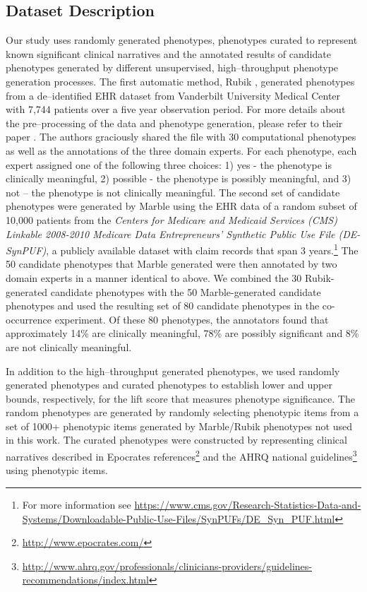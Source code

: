 \documentclass{sig-alternate-05-2015}
\begin{document}
\subsection{Dataset Description}
Our study uses randomly generated phenotypes, phenotypes curated to represent known significant clinical narratives and the annotated results of candidate phenotypes generated by different unsupervised, high--throughput phenotype generation processes. The first automatic method, Rubik \cite{wang2015rubik},
generated phenotypes from a de--identified EHR dataset from Vanderbilt University Medical Center with 7,744 patients over a five year observation period.
For more details about the pre--processing of the data and phenotype generation, please refer to their paper \cite{wang2015rubik}.
The authors graciously shared the file with 30 computational phenotypes as well as the annotations of the three domain experts.
For each phenotype, each expert assigned one of the following three choices: 1) yes - the phenotype is clinically meaningful, 2) possible - the phenotype is possibly meaningful, and 3) not -- the phenotype is not clinically meaningful.
The second set of candidate phenotypes were generated by Marble \cite{Ho:2014da} using the EHR data of a random subset of 10,000 patients from the \emph{ Centers for Medicare and Medicaid Services (CMS) Linkable 2008-2010 Medicare Data Entrepreneurs' Synthetic Public Use File (DE-SynPUF)}, a publicly available dataset with claim records that span 3 years.\footnote{For more information see \url{https://www.cms.gov/Research-Statistics-Data-and-Systems/Downloadable-Public-Use-Files/SynPUFs/DE_Syn_PUF.html}}
The 50 candidate phenotypes that Marble generated were then annotated by two domain experts in a manner identical to above.
We combined the 30 Rubik-generated candidate phenotypes with the 50 Marble-generated candidate phenotypes and used the resulting set of 80 candidate phenotypes in the co-occurrence experiment.
Of these 80 phenotypes,  the annotators found that approximately 14\% are clinically meaningful, 78\% are possibly significant and 8\% are not clinically meaningful.

In addition to the high--throughput generated phenotypes, we used randomly generated phenotypes and curated phenotypes to establish lower and upper bounds, respectively, for the lift score that measures phenotype significance. The random phenotypes are generated by randomly selecting phenotypic items from a set of 1000+ phenotypic items generated by Marble/Rubik phenotypes not used in this work. The curated phenotypes were constructed by representing clinical narratives described in Epocrates references\footnote{\url{http://www.epocrates.com/}} and the AHRQ national guidelines\footnote{\url{http://www.ahrq.gov/professionals/clinicians-providers/guidelines-recommendations/index.html}} using phenotypic items. 
\end{document}
